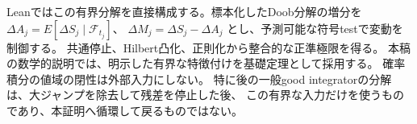 Leanではこの有界分解を直接構成する。標本化したDoob分解の増分を
$\Delta A_j=E[\Delta S_j\mid\mathcal F_{t_j}]$、
$\Delta M_j=\Delta S_j-\Delta A_j$ とし、予測可能な符号testで変動を制御する。
共通停止、Hilbert凸化、正則化から整合的な正準極限を得る。
本稿の数学的説明では、明示した有界な特徴付けを基礎定理として採用する。
確率積分の値域の閉性は外部入力にしない。
特に後の一般good integratorの分解は、大ジャンプを除去して残差を停止した後、
この有界な入力だけを使うものであり、本証明へ循環して戻るものではない。
